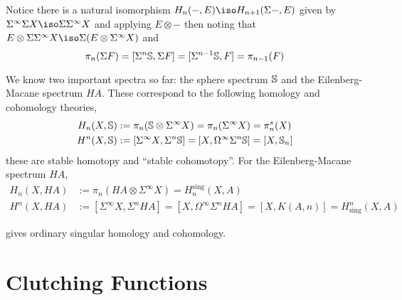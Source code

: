 \documentclass[12pt]{extarticle}
\begin{document}
\begin{rmk}
Notice there is a natural isomorphism $H_n(-,E) \iso H_{n+1}(\Sigma -, E)$ given by $\Sigma^\infty \Sigma X \iso \Sigma \Sigma^\infty X$ and applying $E \otimes -$ then noting that $E \otimes \Sigma \Sigma^\infty X \iso \Sigma (E \otimes \Sigma^\infty X)$ and
\[ \pi_n(\Sigma F) = [\Sigma^n \S, \Sigma F] = [\Sigma^{n-1} \S, F] = \pi_{n-1}(F) \]
\end{rmk}

\begin{rmk}
We know two important spectra so far: the sphere spectrum $\S$ and the Eilenberg-Macane spectrum $HA$. These correspond to the following homology and cohomology theories,
\begin{align*}
H_n(X, \S) & := \pi_n(\S \otimes \Sigma^\infty X) = \pi_n(\Sigma^\infty X) = \pi_n^s(X)
\\
H^n(X, \S) & := [\Sigma^\infty X, \Sigma^n \S] = [X, \Omega^\infty \Sigma^n \S] = [X, \S_n] 
\end{align*}
these are stable homotopy and ``stable cohomotopy''. For the Eilenberg-Macane spectrum $HA$,
\begin{align*}
H_n(X, HA) & := \pi_n(HA \otimes \Sigma^\infty X) = H_n^{\text{sing}}(X, A)
\\
H^n(X, HA) & := [\Sigma^\infty X, \Sigma^n HA] = [X, \Omega^\infty \Sigma^n HA] = [X, K(A,n)] = H^n_{\text{sing}}(X, A)
\end{align*}
\end{rmk}
gives ordinary singular homology and cohomology.

\section{Clutching Functions}
\end{document}
